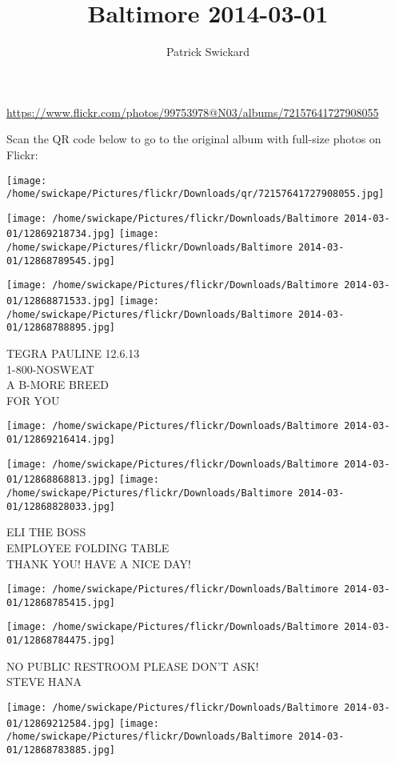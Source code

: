 \documentclass[10pt,letterpaper]{article}
\title{Baltimore 2014-03-01}
\author{Patrick Swickard}
\date{}
\begin{document}
\maketitle

\url{https://www.flickr.com/photos/99753978@N03/albums/72157641727908055}

Scan the QR code below to go to the original album with full-size photos on Flickr:

\texttt{[image: /home/swickape/Pictures/flickr/Downloads/qr/72157641727908055.jpg]}
\pagebreak

\texttt{[image: /home/swickape/Pictures/flickr/Downloads/Baltimore 2014-03-01/12869218734.jpg]}
\texttt{[image: /home/swickape/Pictures/flickr/Downloads/Baltimore 2014-03-01/12868789545.jpg]}

\texttt{[image: /home/swickape/Pictures/flickr/Downloads/Baltimore 2014-03-01/12868871533.jpg]}
\texttt{[image: /home/swickape/Pictures/flickr/Downloads/Baltimore 2014-03-01/12868788895.jpg]}

TEGRA PAULINE 12.6.13\\
1{-}800{-}NOSWEAT\\
A B{-}MORE BREED\\
FOR YOU
\pagebreak

\texttt{[image: /home/swickape/Pictures/flickr/Downloads/Baltimore 2014-03-01/12869216414.jpg]}

\vspace{0.25in}
\texttt{[image: /home/swickape/Pictures/flickr/Downloads/Baltimore 2014-03-01/12868868813.jpg]}
\texttt{[image: /home/swickape/Pictures/flickr/Downloads/Baltimore 2014-03-01/12868828033.jpg]}

ELI THE BOSS\\
EMPLOYEE FOLDING TABLE\\
THANK YOU!  HAVE A NICE DAY!
\pagebreak

\texttt{[image: /home/swickape/Pictures/flickr/Downloads/Baltimore 2014-03-01/12868785415.jpg]}

\vspace{0.25in}
\texttt{[image: /home/swickape/Pictures/flickr/Downloads/Baltimore 2014-03-01/12868784475.jpg]}

NO PUBLIC RESTROOM PLEASE DON'T ASK!\\
STEVE HANA
\pagebreak

\texttt{[image: /home/swickape/Pictures/flickr/Downloads/Baltimore 2014-03-01/12869212584.jpg]}
\texttt{[image: /home/swickape/Pictures/flickr/Downloads/Baltimore 2014-03-01/12868783885.jpg]}
\end{document}
